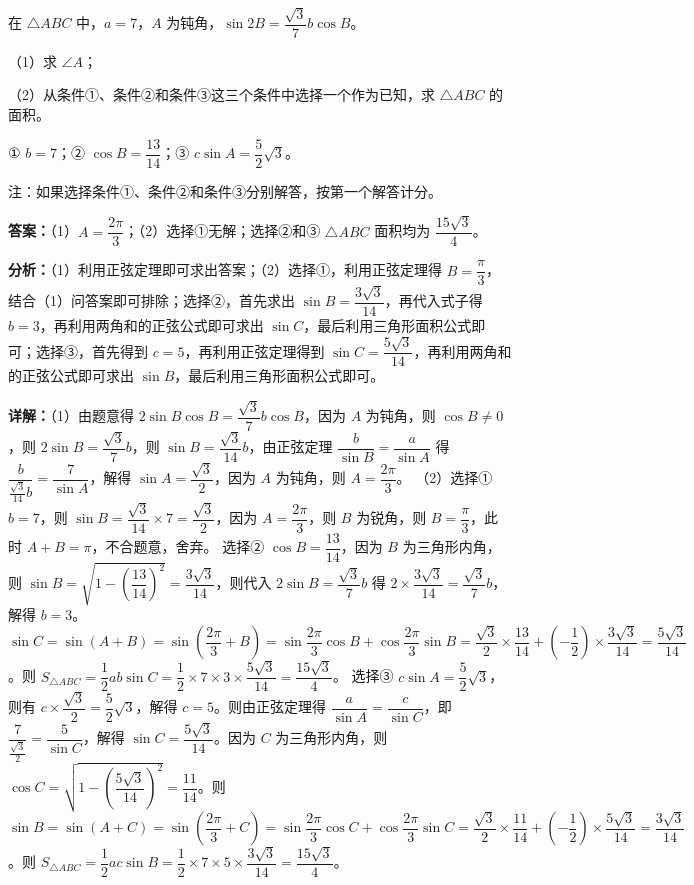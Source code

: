 \begin{question}[points=13]
在 $\triangle ABC$ 中，$a=7$，$A$ 为钝角，$\sin 2B = \dfrac{\sqrt{3}}{7} b \cos B$。

（1）求 $\angle A$；

（2）从条件①、条件②和条件③这三个条件中选择一个作为已知，求 $\triangle ABC$ 的面积。

① $b=7$；② $\cos B = \dfrac{13}{14}$；③ $c\sin A = \dfrac{5}{2}\sqrt{3}$。

注：如果选择条件①、条件②和条件③分别解答，按第一个解答计分。
\begin{solution}
\textbf{答案：}（1）$A=\dfrac{2\pi}{3}$；（2）选择①无解；选择②和③ $\triangle ABC$ 面积均为 $\dfrac{15\sqrt{3}}{4}$。

\textbf{分析：}（1）利用正弦定理即可求出答案；（2）选择①，利用正弦定理得 $B=\dfrac{\pi}{3}$，结合（1）问答案即可排除；选择②，首先求出 $\sin B = \dfrac{3\sqrt{3}}{14}$，再代入式子得 $b=3$，再利用两角和的正弦公式即可求出 $\sin C$，最后利用三角形面积公式即可；选择③，首先得到 $c=5$，再利用正弦定理得到 $\sin C = \dfrac{5\sqrt{3}}{14}$，再利用两角和的正弦公式即可求出 $\sin B$，最后利用三角形面积公式即可。

\textbf{详解：}（1）由题意得 $2\sin B \cos B = \dfrac{\sqrt{3}}{7} b \cos B$，因为 $A$ 为钝角，则 $\cos B \neq 0$，则 $2\sin B = \dfrac{\sqrt{3}}{7} b$，则 $\sin B = \dfrac{\sqrt{3}}{14} b$，由正弦定理 $\dfrac{b}{\sin B} = \dfrac{a}{\sin A}$ 得 $\dfrac{b}{\frac{\sqrt{3}}{14}b} = \dfrac{7}{\sin A}$，解得 $\sin A = \dfrac{\sqrt{3}}{2}$，因为 $A$ 为钝角，则 $A = \dfrac{2\pi}{3}$。
（2）选择① $b=7$，则 $\sin B = \dfrac{\sqrt{3}}{14} \times 7 = \dfrac{\sqrt{3}}{2}$，因为 $A=\dfrac{2\pi}{3}$，则 $B$ 为锐角，则 $B = \dfrac{\pi}{3}$，此时 $A+B = \pi$，不合题意，舍弃。
选择② $\cos B = \dfrac{13}{14}$，因为 $B$ 为三角形内角，则 $\sin B = \sqrt{1-\left(\dfrac{13}{14}\right)^2} = \dfrac{3\sqrt{3}}{14}$，则代入 $2\sin B = \dfrac{\sqrt{3}}{7} b$ 得 $2\times \dfrac{3\sqrt{3}}{14} = \dfrac{\sqrt{3}}{7} b$，解得 $b=3$。$\sin C = \sin(A+B) = \sin\left(\dfrac{2\pi}{3}+B\right) = \sin\dfrac{2\pi}{3}\cos B + \cos\dfrac{2\pi}{3}\sin B = \dfrac{\sqrt{3}}{2}\times\dfrac{13}{14} + \left(-\dfrac{1}{2}\right)\times\dfrac{3\sqrt{3}}{14} = \dfrac{5\sqrt{3}}{14}$。则 $S_{\triangle ABC} = \dfrac{1}{2}ab\sin C = \dfrac{1}{2}\times7\times3\times\dfrac{5\sqrt{3}}{14} = \dfrac{15\sqrt{3}}{4}$。
选择③ $c\sin A = \dfrac{5}{2}\sqrt{3}$，则有 $c\times\dfrac{\sqrt{3}}{2} = \dfrac{5}{2}\sqrt{3}$，解得 $c=5$。则由正弦定理得 $\dfrac{a}{\sin A} = \dfrac{c}{\sin C}$，即 $\dfrac{7}{\frac{\sqrt{3}}{2}} = \dfrac{5}{\sin C}$，解得 $\sin C = \dfrac{5\sqrt{3}}{14}$。因为 $C$ 为三角形内角，则 $\cos C = \sqrt{1-\left(\dfrac{5\sqrt{3}}{14}\right)^2} = \dfrac{11}{14}$。则 $\sin B = \sin(A+C) = \sin\left(\dfrac{2\pi}{3}+C\right) = \sin\dfrac{2\pi}{3}\cos C + \cos\dfrac{2\pi}{3}\sin C = \dfrac{\sqrt{3}}{2}\times\dfrac{11}{14} + \left(-\dfrac{1}{2}\right)\times\dfrac{5\sqrt{3}}{14} = \dfrac{3\sqrt{3}}{14}$。则 $S_{\triangle ABC} = \dfrac{1}{2}ac\sin B = \dfrac{1}{2}\times7\times5\times\dfrac{3\sqrt{3}}{14} = \dfrac{15\sqrt{3}}{4}$。
\end{solution}
\end{question}

